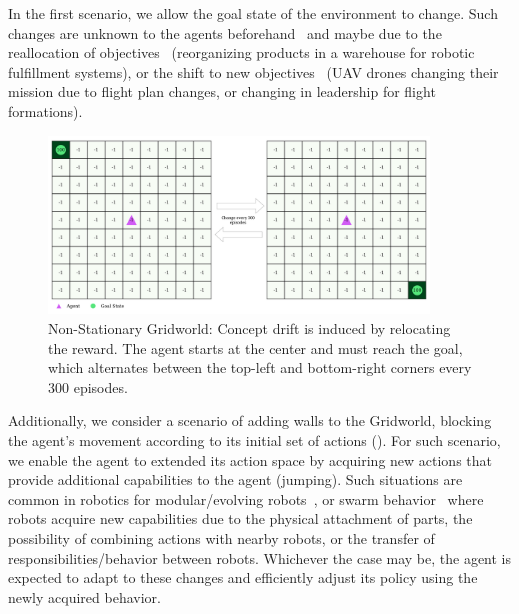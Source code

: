 In the first scenario, we allow the goal state of the environment to change. Such changes are unknown 
to the agents beforehand~\cite{cardozo21} and maybe due to the reallocation of 
objectives~\cite{khetarpal2022continualreinforcementlearningreview} (\eg reorganizing products in a 
warehouse for robotic fulfillment systems), or the shift to new objectives~\cite{florensa18} (\eg UAV drones 
changing their mission due to flight plan changes, or changing in leadership for flight formations).

\begin{figure}[hptb]
    \centering
    \includegraphics[width=0.9\textwidth]{figures/rewards_change}
    \caption{Non-Stationary Gridworld: Concept drift is induced by relocating the reward. The agent starts at the center and must reach the goal, which alternates between the top-left and bottom-right corners every 300 episodes.}
    \label{fig:r-change}
\end{figure}

Additionally, we consider a scenario of adding walls to the Gridworld, blocking the agent's movement 
according to its initial set of actions (). For such scenario, we enable the agent 
to  extended its action space by acquiring new actions that provide additional capabilities to the agent 
(\ie jumping). Such situations are common in robotics for modular/evolving 
robots~\cite{eiben20evolving,miras20environmental}, or swarm behavior~\cite{schranz20swarm} where 
robots acquire new capabilities due to the physical attachment of parts, the possibility of combining 
actions with nearby robots, or the transfer of responsibilities/behavior between robots. Whichever the 
case may be, the agent is expected to adapt to these changes and efficiently adjust its policy using 
the newly acquired behavior.


\endinput

